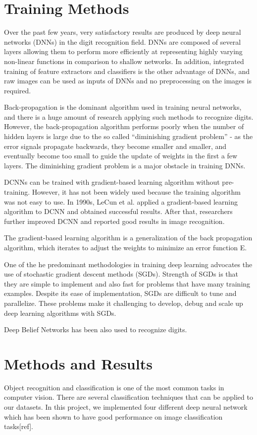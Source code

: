 \section{Training Methods}
Over the past few years, very satisfactory results are produced by deep neural
networks (DNNs) in the digit recognition field. DNNs are composed of several
layers allowing them to perform more efficiently at representing highly varying
non-linear functions in comparison to shallow networks. In addition, integrated
training of feature extractors and classifiers is the other advantage of DNNs,
and raw images can be used as inputs of DNNs and no preprocessing on the images
is required. 

Back-propagation is the dominant algorithm used in training neural networks,
and there is a huge amount of research applying such methods to recognize
digits. However, the back-propagation algorithm performs poorly when the number
of hidden layers is large due to the so called “diminishing gradient problem” -
as the error signals propagate backwards, they become smaller and smaller, and
eventually become too small to guide the update of weights in the first a few
layers. The diminishing gradient problem is a major obstacle in training DNNs. 

DCNNs can be trained with gradient-based learning algorithm without
pre-training. However, it has not been widely used because the training
algorithm was not easy to use. In 1990s, LeCun et al. applied a gradient-based
learning algorithm to DCNN and obtained successful results. After that,
researchers further improved DCNN and reported good results in image
recognition.

The gradient-based learning algorithm is a generalization of the
back propagation algorithm, which iterates to adjust the weights to minimize an
error function E.

One of the he predominant methodologies in training deep learning advocates
the use of stochastic gradient descent methods (SGDs). Strength of SGDs is
that they are simple to implement and also fast for problems that have many
training examples. Despite its ease of implementation, SGDs are difficult to
tune and parallelize. These problems make it challenging to develop, debug and
scale up deep learning algorithms with SGDs.

Deep Belief Networks has been also used to recognize digits.



\section{Methods and Results}\label{Methods and Results}
Object recognition and classification is one of the most common tasks in computer vision. There are several classification techniques that can be applied to our datasets. In this project, we implemented four different deep neural network which has been shown to have good performance on image classification tasks[ref].



